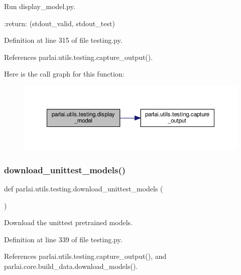 \begin{DoxyVerb}Run display_model.py.

:return: (stdout_valid, stdout_test)
\end{DoxyVerb}
 

Definition at line 315 of file testing.\+py.



References parlai.\+utils.\+testing.\+capture\+\_\+output().

Here is the call graph for this function\+:
\nopagebreak
\begin{figure}[H]
\begin{center}
\leavevmode
\includegraphics[width=350pt]{namespaceparlai_1_1utils_1_1testing_a1b41200277931b2e4e684dc9452889a9_cgraph}
\end{center}
\end{figure}
\mbox{\label{namespaceparlai_1_1utils_1_1testing_ae0c93fc8f4c3e079333dba0065fa4dd2}} 
\subsubsection{\texorpdfstring{download\+\_\+unittest\+\_\+models()}{download\_unittest\_models()}}
{\footnotesize\ttfamily def parlai.\+utils.\+testing.\+download\+\_\+unittest\+\_\+models (\begin{DoxyParamCaption}{ }\end{DoxyParamCaption})}

\begin{DoxyVerb}Download the unittest pretrained models.\end{DoxyVerb}
 

Definition at line 339 of file testing.\+py.



References parlai.\+utils.\+testing.\+capture\+\_\+output(), and parlai.\+core.\+build\+\_\+data.\+download\+\_\+models().

